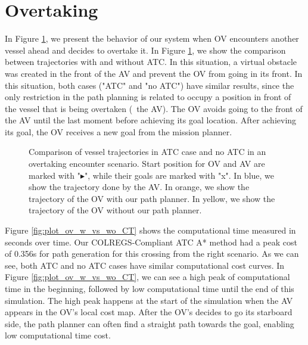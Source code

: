         \section{Overtaking}
        
        In Figure \ref{fig:plot_ov_w_vs_wo}, we present the behavior of our system when \ac{OV} encounters another vessel ahead and decides to overtake it. In Figure \ref{fig:plot_ov_w_vs_wo}, we show the comparison between trajectories with and without \ac{ATC}. In this situation, a virtual obstacle was created in the front of the \ac{AV} and prevent the \ac{OV} from going in its front. In this situation, both cases ("ATC" and "no ATC") have similar results, since the only restriction in the path planning is related to occupy a position in front of the vessel that is being overtaken (\ie{}~the \ac{AV}). The \ac{OV} avoids going to the front of the \ac{AV} until the last moment before achieving its goal location. After achieving its goal, the \ac{OV} receives a new goal from the mission planner.
        
        \begin{figure}[H]
            \centering
            
            \caption{Comparison of vessel trajectories in \ac{ATC} case and no \ac{ATC} in an overtaking encounter scenario. Start position for \ac{OV} and \ac{AV} are marked with "$\blacktriangleright$", while their goals are marked with "x". In blue, we show the trajectory done by the \ac{AV}. In orange, we show the trajectory of the \ac{OV} with our path planner. In yellow, we show the trajectory of the \ac{OV} without our path planner.}
            \label{fig:plot_ov_w_vs_wo}
        \end{figure}
        
        Figure \ref{fig:plot_ov_w_vs_wo_CT} shows the computational time measured in seconds over time. Our \ac{COLREGS}-Compliant \ac{ATC} A* method had a peak cost of 0.356s for path generation for this crossing from the right scenario. As we can see, both \ac{ATC} and no \ac{ATC} cases have similar computational cost curves. In Figure \ref{fig:plot_ov_w_vs_wo_CT}, we can see a high peak of computational time in the beginning, followed by low computational time until the end of this simulation. The high peak happens at the start of the simulation when the \ac{AV} appears in the \ac{OV}'s local cost map. After the \ac{OV}'s decides to go its starboard side, the path planner can often find a straight path towards the goal, enabling low computational time cost. 
        
